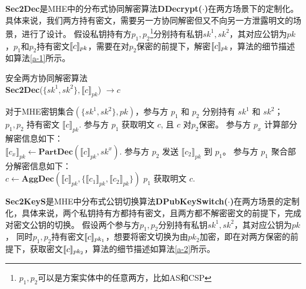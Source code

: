 \textbf{Sec2Dec}是MHE中的分布式协同解密算法\textbf{DDecrypt($\cdot$)}在两方场景下的定制化。具体来说，我们两方持有密文，需要另一方协同解密但又不向另一方泄露明文的场景，进行了设计。
假设私钥持有方$p_1,p_2$\footnote{$p_1,p_2$可以是方案实体中的任意两方，比如AS和CSP}分别持有私钥$sk^1, sk^2$，其对应公钥为$ pk $，$ p_1 $和$p_2$持有密文$\ctx[pk]{c}$，需要在对$p_2$保密的前提下，解密$\ctx[pk]{c}$，算法的细节描述如算法\ref{a-1}所示。
\begin{algorithm}[htbp]
	\caption{安全两方协同解密算法\\ \textbf{Sec2Dec}($\{sk^1, sk^2\}, \llbracket c\rrbracket_{pk}$) $\rightarrow c$}
	\label{a-1}
	\begin{algorithmic}[1]
		\REQUIRE 对于MHE密钥集合$(\{sk^1, sk^2\}, pk)$，参与方 $p_1$ 和 $p_2$ 分别持有 $sk^1$ 和 $sk^2$；$p_1, p_2$ 持有密文 $\llbracket c\rrbracket_{pk}$.
		\ENSURE 参与方 $p_1$ 获取明文 $c$, 且 $c$ 对$ p_2 $保密。
		\STATE 参与方 $p_x$ 计算部分解密信息如下：\\ $\llbracket c_x\rrbracket_{pk} \leftarrow \textbf{PartDec}(\llbracket c\rrbracket_{pk}, sk^x)$. 
		\ENDFOR
		\STATE 参与方 $p_2$ 发送 $\llbracket c_2\rrbracket_{pk}$ 到 $p_1$。
		\STATE 参与方 $p_1$ 聚合部分解密信息如下：\\ $c \leftarrow \textbf{AggDec}(\llbracket c\rrbracket_{pk}, \{\llbracket c_1\rrbracket_{pk}, \llbracket c_2\rrbracket_{pk}\})$
		\RETURN $p_1$ 获取明文 $ c $.
	\end{algorithmic}
\end{algorithm}

\textbf{Sec2KeyS}是MHE中分布式公钥切换算法\textbf{DPubKeySwitch($ \cdot $)}在两方场景的定制化，具体来说，两个私钥持有方都持有密文，且两方都不解密密文的前提下，完成对密文公钥的切换。
假设两个参与方$p_1, p_2$分别持有私钥$sk^1, sk^2$，其对应公钥为$ pk $，
同时$p_1, p_2$持有密文$ \ctx[pk_1]{c} $，想要将密文切换为由$ pk_2 $加密，即在对两方保密的前提下，获取密文$ \ctx[pk_2]{c} $，算法的细节描述如算法\ref{a-2}所示。

